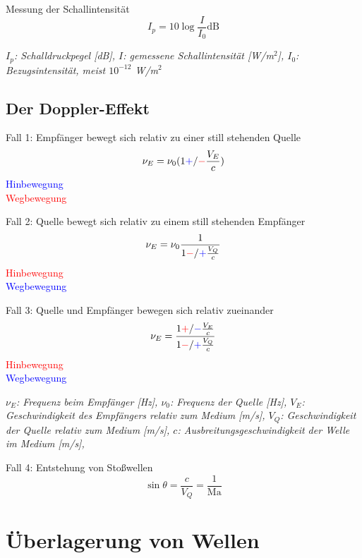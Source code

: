 \documentclass[a4paper,10pt]{article}
\newenvironment{displayformula}
{
	\begin{framed}
		\color{formulaColor}
	}
	{\end{framed}}
\newcommand{\formulalegend}[1]{%
	\par\vspace{0.5ex}%
	{{\color{legendColor}\RaggedRight\small\textit{#1}}}%
	\par\vspace{1.5ex}%
}
\begin{document}
\begin{displayformula}
	Messung der Schallintensität
	\[
	I_p = 10\log \frac{I}{I_0} \text{dB}
	\]
\end{displayformula}
\formulalegend{
	$I_p$: Schalldruckpegel [dB], 
	$I$: gemessene Schallintensität [W/m$^2$], 
	$I_0$: Bezugsintensität, meist $10^{-12}$ W/m$^2$
}



\subsection{Der Doppler-Effekt}

\begin{displayformula}
	Fall 1: Empfänger bewegt sich relativ zu einer still stehenden Quelle
	\[
	\nu_E = \nu_0 (1 \textcolor{blue}{+} / \textcolor{red}{-} \frac{V_E}{c})
	\]
	\textcolor{blue}{Hinbewegung} \\
	\textcolor{red}{Wegbewegung}
\end{displayformula}

\begin{displayformula}
	Fall 2: Quelle bewegt sich relativ zu einem still stehenden Empfänger
	\[
	\nu_E = \nu_0 \frac{1}{1 \textcolor{red}{-} / \textcolor{blue}{+} \frac{V_Q}{c}}
	\]
	\textcolor{red}{Hinbewegung} \\
	\textcolor{blue}{Wegbewegung}
\end{displayformula}

\begin{displayformula}
	Fall 3: Quelle und Empfänger bewegen sich relativ zueinander
	\[
	\nu_E = \frac{1 \textcolor{red}{+} / \textcolor{blue}{-} \frac{V_E}{c}}{1 \textcolor{red}{-} / \textcolor{blue}{+} \frac{V_Q}{c}}
	\]
	\textcolor{red}{Hinbewegung} \\
	\textcolor{blue}{Wegbewegung}
\end{displayformula}

\formulalegend{
	$\nu_E$: Frequenz beim Empfänger [Hz], 
	$\nu_0$: Frequenz der Quelle [Hz], 
	$V_E$: Geschwindigkeit des Empfängers relativ zum Medium [m/s], 
	$V_Q$: Geschwindigkeit der Quelle relativ zum Medium [m/s], 
	$c$: Ausbreitungsgeschwindigkeit der Welle im Medium [m/s], 
}

\begin{displayformula}
	Fall 4: Entstehung von Stoßwellen
	\[
	\sin \theta = \frac{c}{V_Q} = \frac{1}{\text{Ma}}
	\]
\end{displayformula}

\section{Überlagerung von Wellen}
\end{document}
